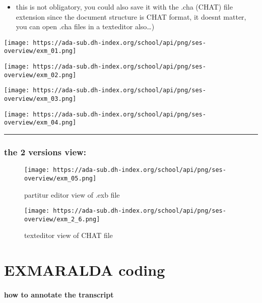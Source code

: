 \documentclass[
  12pt,
]{article}
\providecommand{\tightlist}{%
  \setlength{\itemsep}{0pt}\setlength{\parskip}{0pt}}
\begin{document}
\begin{itemize}
  \begin{itemize}
  \tightlist
  \item
    this is not obligatory, you could also save it with the .cha (CHAT)
    file extension since the document structure is CHAT format, it
    doesnt matter, you can open .cha files in a texteditor also\ldots)
  \end{itemize}
\end{itemize}

\texttt{[image: https://ada-sub.dh-index.org/school/api/png/ses-overview/exm\_01.png]}

\texttt{[image: https://ada-sub.dh-index.org/school/api/png/ses-overview/exm\_02.png]}

\texttt{[image: https://ada-sub.dh-index.org/school/api/png/ses-overview/exm\_03.png]}

\texttt{[image: https://ada-sub.dh-index.org/school/api/png/ses-overview/exm\_04.png]}

\begin{center}\rule{0.5\linewidth}{0.5pt}\end{center}

\hypertarget{the-2-versions-view}{%
\subsubsection{the 2 versions view:}\label{the-2-versions-view}}

\begin{figure}
\centering
\texttt{[image: https://ada-sub.dh-index.org/school/api/png/ses-overview/exm\_05.png]}
\caption{partitur editor view of .exb file}
\end{figure}

\begin{figure}
\centering
\texttt{[image: https://ada-sub.dh-index.org/school/api/png/ses-overview/exm\_2\_6.png]}
\caption{texteditor view of CHAT file}
\end{figure}

\hypertarget{exmaralda-coding}{%
\section{EXMARALDA coding}\label{exmaralda-coding}}

\hypertarget{how-to-annotate-the-transcript}{%
\paragraph{how to annotate the
transcript}\label{how-to-annotate-the-transcript}}
\end{document}
